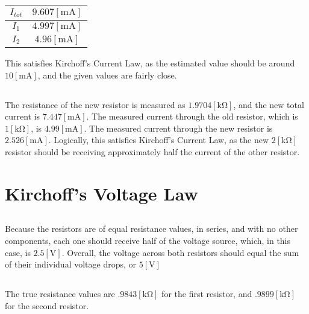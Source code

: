 \documentclass[
	letterpaper, %
	10pt, %
]{CSUniSchoolLabReport}
\begin{document}
\begin{center}
  \begin{tabular}[h]{|c|c|}
    \hline
    $I_{tot}$ & $9.607[\si{\milli\ampere}]$\\
    \hline
    $I_1$ & $4.997[\si{\milli\ampere}]$\\
    \hline
    $I_2$ & $4.96[\si{\milli\ampere}]$\\
    \hline
  \end{tabular}
\end{center}

This satisfies Kirchoff's Current Law, as the estimated value should be around $10[\si{\milli\ampere}]$, and the given values are fairly close.

\subsection{}

The resistance of the new resistor is measured as $1.9704[\si{\kilo\ohm}]$, and the new total current is $7.447[\si{\milli\ampere}]$. The measured current through the old resistor, which is $1[\si{\kilo\ohm}]$, is $4.99[\si{\milli\ampere}]$. The measured current through the new resistor is $2.526[\si{\milli\ampere}]$. Logically, this satisfies Kirchoff's Current Law, as the new $2[\si{\kilo\ohm}]$ resistor should be receiving approximately half the current of the other resistor.

\section{Kirchoff's Voltage Law}

\subsection{}

Because the resistors are of equal resistance values, in series, and with no other components, each one should receive half of the voltage source, which, in this case, is $2.5[\si{\volt}]$. Overall, the voltage across both resistors should equal the sum of their individual voltage drops, or $5[\si{\volt}]$

\subsection{}

The true resistance values are $.9843[\si{\kilo\ohm}]$ for the first resistor, and $.9899[\si{\kilo\ohm}]$ for the second resistor.
\end{document}
